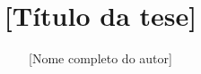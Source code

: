 \documentclass[pt,phd,twoside,11pt,utf8,a4paper]{thesisdifctunl}
\title{[Título da tese]}
\author{[Nome completo do autor]}
\begin{document}
\frontmatter

\frontpage

\printcopyright

\printdedicatory

\printacknowledgements

\printabstract

\tableofcontents 

\printotherlists 

\printchapters

\printbibliography

\printappendixes 

\end{document}
